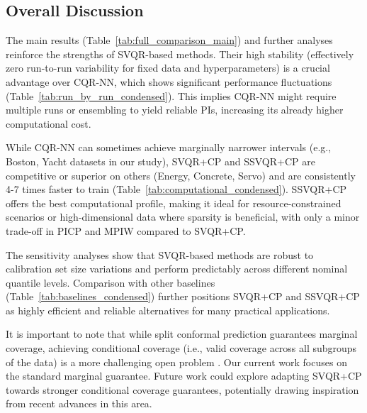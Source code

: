 \documentclass{article}
\begin{document}
\subsection{Overall Discussion}
The main results (Table~\ref{tab:full_comparison_main}) and further analyses reinforce the strengths of SVQR-based methods. Their high stability (effectively zero run-to-run variability for fixed data and hyperparameters) is a crucial advantage over CQR-NN, which shows significant performance fluctuations (Table~\ref{tab:run_by_run_condensed}). This implies CQR-NN might require multiple runs or ensembling to yield reliable PIs, increasing its already higher computational cost.

While CQR-NN can sometimes achieve marginally narrower intervals (e.g., Boston, Yacht datasets in our study), SVQR+CP and SSVQR+CP are competitive or superior on others (Energy, Concrete, Servo) and are consistently 4-7 times faster to train (Table~\ref{tab:computational_condensed}). SSVQR+CP offers the best computational profile, making it ideal for resource-constrained scenarios or high-dimensional data where sparsity is beneficial, with only a minor trade-off in PICP and MPIW compared to SVQR+CP.

The sensitivity analyses show that SVQR-based methods are robust to calibration set size variations and perform predictably across different nominal quantile levels. Comparison with other baselines (Table~\ref{tab:baselines_condensed}) further positions SVQR+CP and SSVQR+CP as highly efficient and reliable alternatives for many practical applications.

It is important to note that while split conformal prediction guarantees marginal coverage, achieving conditional coverage (i.e., valid coverage across all subgroups of the data) is a more challenging open problem \citep{Vovk2012ConditionalPI, Jung2023ConditionalCP}. Our current work focuses on the standard marginal guarantee. Future work could explore adapting SVQR+CP towards stronger conditional coverage guarantees, potentially drawing inspiration from recent advances in this area.
\end{document}
